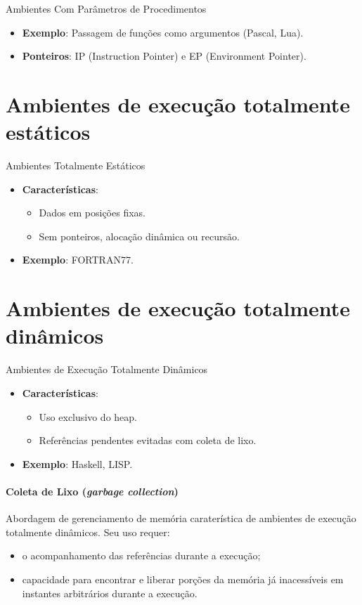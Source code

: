\documentclass{beamer}
\newcommand{\slide}[2]{
	\begin{frame}{\insertsection}
		\framesubtitle{#1}
		#2
	\end{frame}
}
\begin{document}
\begin{frame}{Ambientes Com Parâmetros de Procedimentos}
	\begin{itemize}
		\item \textbf{Exemplo}: Passagem de funções como argumentos (Pascal, Lua).
		\item \textbf{Ponteiros}: IP (Instruction Pointer) e EP (Environment Pointer).
	\end{itemize}
\end{frame}

\section{Ambientes de execução totalmente estáticos}

\begin{frame}{Ambientes Totalmente Estáticos}
	\begin{itemize}
		\item \textbf{Características}:
		      \begin{itemize}
			      \item Dados em posições fixas.
			      \item Sem ponteiros, alocação dinâmica ou recursão.
		      \end{itemize}
		\item \textbf{Exemplo}: FORTRAN77.
	\end{itemize}
\end{frame}

\section{Ambientes de execução totalmente dinâmicos}

\begin{frame}{Ambientes de Execução Totalmente Dinâmicos}
	\begin{itemize}
		\item \textbf{Características}:
		      \begin{itemize}
			      \item Uso exclusivo do heap.
			      \item Referências pendentes evitadas com coleta de lixo.
		      \end{itemize}
		\item \textbf{Exemplo}: Haskell, LISP.
	\end{itemize}
\end{frame}

\slide{Coleta de Lixo (\textit{garbage collection})}{
	Abordagem de gerenciamento de memória caraterística de ambientes de
	execução totalmente dinâmicos. \pause Seu uso requer:
	\begin{itemize}
		\item o acompanhamento das referências durante a execução;
		      \pause
		\item capacidade para encontrar e liberar porções da memória já inacessíveis em instantes arbitrários durante a execução.
	\end{itemize}
}
\end{document}

